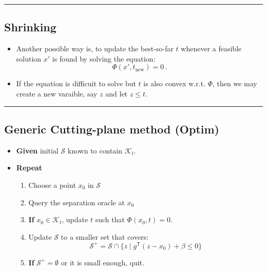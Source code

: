 \documentclass[
]{article}
\providecommand{\tightlist}{%
  \setlength{\itemsep}{0pt}\setlength{\parskip}{0pt}}
\begin{document}
\begin{center}\rule{0.5\linewidth}{0.5pt}\end{center}

\subsection{Shrinking}\label{shrinking}

\begin{itemize}
\item
  Another possible way is, to update the best-so-far \(t\) whenever a
  feasible solution \(x'\) is found by solving the equation:
  \[\Phi(x', t_\text{new}) = 0 \, .\]
\item
  If the equation is difficuit to solve but \(t\) is also convex w.r.t.
  \(\Phi\), then we may create a new varaible, say \(z\) and let
  \(z \le t\).
\end{itemize}

\begin{center}\rule{0.5\linewidth}{0.5pt}\end{center}

\subsection{Generic Cutting-plane method
(Optim)}\label{generic-cutting-plane-method-optim}

\begin{itemize}
\tightlist
\item
  \textbf{Given} initial \(\mathcal{S}\) known to contain
  \(\mathcal{K}_t\).
\item
  \textbf{Repeat}

  \begin{enumerate}
  \def\labelenumi{\arabic{enumi}.}
  \tightlist
  \item
    Choose a point \(x_0\) in \(\mathcal{S}\)
  \item
    Query the separation oracle at \(x_0\)
  \item
    \textbf{If} \(x_0 \in \mathcal{K}_t\), update \(t\) such that
    \(\Phi(x_0, t) = 0\).
  \item
    Update \(\mathcal{S}\) to a smaller set that covers:
    \[\mathcal{S}^+ = \mathcal{S} \cap \{z \mid g^\mathsf{T} (z - x_0) + \beta \le 0\} \]
  \item
    \textbf{If} \(\mathcal{S}^+ = \emptyset\) or it is small enough,
    quit.
  \end{enumerate}
\end{itemize}
\end{document}
